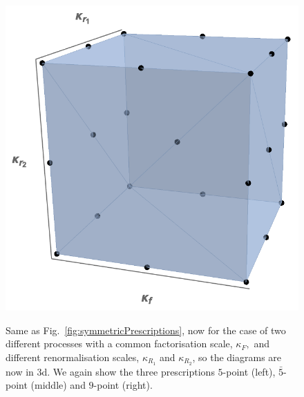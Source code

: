 \begin{figure}[t]
\includegraphics[scale=0.35]{mhous/plots/9pt_3D.png}
\begin{caption}{\small Same as Fig.~\ref{fig:symmetricPrescriptions}, now
    for the case of two different processes with a common factorisation scale, $\kappa_F,$ and different renormalisation scales, $\kappa_{R_1}$
    and $\kappa_{R_2}$, so the diagrams are now in 3d.
    We again show the three prescriptions $5$-point (left), $\bar{5}$-point (middle) and $9$-point (right).}
  \label{fig:symmetricPrescriptions2proc}
\end{caption}
\end{figure}
